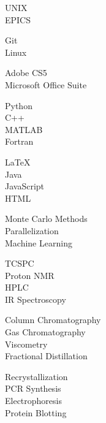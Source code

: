 
\begin{minipage}[t]{0.2\textwidth}
	\flushleft
\end{minipage}
\begin{minipage}[t]{0.8\textwidth}
	{
		\begin{minipage}[t]{0.30\textwidth}
			UNIX\\
			EPICS
		\end{minipage}
		\begin{minipage}[t]{0.30\textwidth}
			Git\\
			Linux
		\end{minipage}
		\begin{minipage}[t]{0.30\textwidth}
			Adobe CS5\\
			Microsoft Office Suite
		\end{minipage}
	}
	
	\vspace*{4pt}
	{
		\begin{minipage}[t]{0.30\textwidth}
			Python\\
			C++\\
			MATLAB\\
			Fortran
		\end{minipage}
		\begin{minipage}[t]{0.30\textwidth}
			\LaTeX\\
			Java\\
			JavaScript\\
			HTML
		\end{minipage}
		\begin{minipage}[t]{0.30\textwidth}
			Monte Carlo Methods\\
			Parallelization\\
			Machine Learning
		\end{minipage}
	}
	
	\vspace*{4pt}
	{
		\begin{minipage}[t]{0.30\textwidth}
			TCSPC\\
			Proton NMR\\
			HPLC\\
			IR Spectroscopy
		\end{minipage}
		\begin{minipage}[t]{0.30\textwidth}
			Column Chromatography\\
			Gas Chromatography\\
			Viscometry\\
			Fractional Distillation
		\end{minipage}
		\begin{minipage}[t]{0.30\textwidth}
			Recrystallization\\
			PCR Synthesis\\
			Electrophoresis\\
			Protein Blotting
		\end{minipage}
	}
	

\end{minipage}
